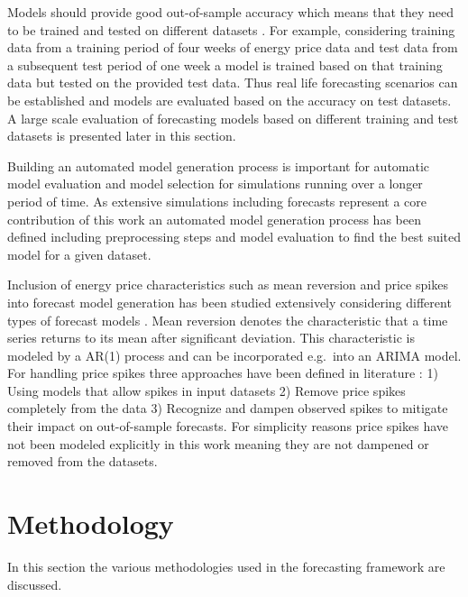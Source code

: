 Models should provide good out-of-sample accuracy which means that they need to be trained and tested on different datasets \cite{hyndman2012forecasting}. For example, considering training data from a training period of four weeks of energy price data and test data from a subsequent test period of one week a model is trained based on that training data but tested on the provided test data. Thus real life forecasting scenarios can be established and models are evaluated based on the accuracy on test datasets. A large scale evaluation of forecasting models based on different training and test datasets is presented later in this section. 

Building an automated model generation process is important for automatic model evaluation and model selection for simulations running over a longer period of time. As extensive simulations including forecasts represent a core contribution of this work an automated model generation process has been defined including preprocessing steps and model evaluation to find the best suited model for a given dataset. 

Inclusion of energy price characteristics such as mean reversion and price spikes into forecast model generation has been studied extensively considering different types of forecast models \cite{weron2008forecasting,bunn2003forecasting,aggarwal2009electricity}. Mean reversion denotes the characteristic that a time series returns to its mean after significant deviation. This characteristic is modeled by a AR(1) process and can be incorporated e.g.~into an ARIMA model. For handling price spikes three approaches have been defined in literature \cite{weron2008forecasting}: 1) Using models that allow spikes in input datasets 2) Remove price spikes completely from the data 3) Recognize and dampen observed spikes to mitigate their impact on out-of-sample forecasts. For simplicity reasons price spikes have not been modeled explicitly in this work meaning they are not dampened or removed from the datasets. 



\section{Methodology}

In this section the various methodologies used in the forecasting framework are discussed. 



